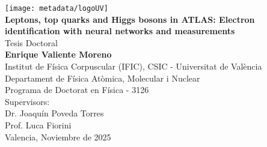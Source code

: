 \begin{titlepage}
    \begin{center}
        \vspace*{1cm} 
        \texttt{[image: metadata/logoUV]}\\[15mm]

        {\Large{\textbf{Leptons, top quarks and Higgs bosons in ATLAS: Electron identification with neural networks and \ttH measurements}}}\\[15mm]

        Tesis Doctoral\\
        {\large{\textbf{Enrique Valiente Moreno}}}\\[15mm]

        Institut de Física Corpuscular (IFIC), CSIC - Universitat de València\\
        Departament de Física Atòmica, Molecular i Nuclear\\
        Programa de Doctorat en Física - 3126\\[15mm]

        Supervisors:\\
        Dr. Joaquín Poveda Torres\\
        Prof. Luca Fiorini\\[15mm]

        Valencia, Noviembre de 2025
    \end{center}

\end{titlepage}